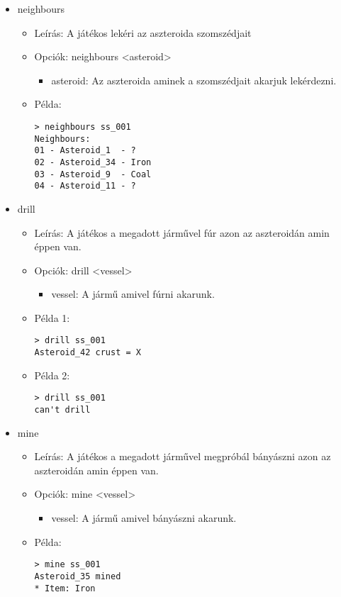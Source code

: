 \documentclass[../../projlab]{subfiles}
\begin{document}
\begin{itemize}
    \item neighbours
    \begin{itemize}
        \item Leírás: A játékos lekéri az aszteroida szomszédjait
        \item Opciók: neighbours <asteroid>
        \begin{itemize}
            \item asteroid: Az aszteroida aminek a szomszédjait akarjuk lekérdezni.
        \end{itemize}
        \item Példa:
            \begin{verbatim}
> neighbours ss_001
Neighbours:
01 - Asteroid_1  - ?
02 - Asteroid_34 - Iron
03 - Asteroid_9  - Coal
04 - Asteroid_11 - ?
            \end{verbatim}
    \end{itemize}


    \item drill
    \begin{itemize}
        \item Leírás: A játékos a megadott járművel fúr azon az aszteroidán amin éppen van.
        \item Opciók: drill <vessel>
        \begin{itemize}
            \item vessel: A jármű amivel fúrni akarunk.
        \end{itemize}
        \item Példa 1:
            \begin{verbatim}
> drill ss_001 
Asteroid_42 crust = X
            \end{verbatim}
        \item Példa 2:
            \begin{verbatim}
> drill ss_001 
can't drill
            \end{verbatim}
    \end{itemize}


    \item mine
    \begin{itemize}
        \item Leírás: A játékos a megadott járművel megpróbál bányászni azon az aszteroidán amin éppen van.
        \item Opciók: mine <vessel>
        \begin{itemize}
            \item vessel: A jármű amivel bányászni akarunk.
        \end{itemize}
        \item Példa:
            \begin{verbatim}
> mine ss_001
Asteroid_35 mined
* Item: Iron
            \end{verbatim}
    \end{itemize}



\end{itemize}
\end{document}
